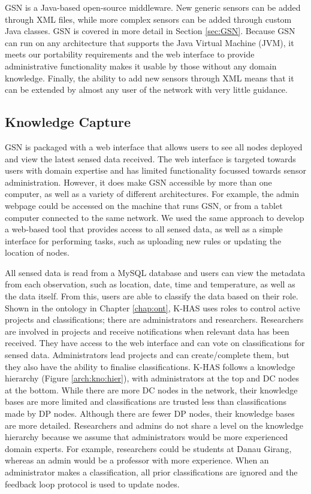 	GSN is a Java-based open-source middleware. New generic sensors can be added through XML files, while more complex sensors can be added through custom Java classes. GSN is covered in more detail in Section \ref{sec:GSN}. Because GSN can run on any architecture that supports the Java Virtual Machine (JVM), it meets our portability requirements and the web interface to provide administrative functionality makes it usable by those without any domain knowledge. Finally, the ability to add new sensors through XML means that it can be extended by almost any user of the network with very little guidance.

	\subsection{Knowledge Capture}\label{arch:kc}
		GSN is packaged with a web interface that allows users to see all nodes deployed and view the latest sensed data received. The web interface is targeted towards users with domain expertise and has limited functionality focussed towards sensor administration. However, it does make GSN accessible by more than one computer, as well as a variety of different architectures. For example, the admin webpage could be accessed on the machine that runs GSN, or from a tablet computer connected to the same network. We used the same approach to develop a web-based tool that provides access to all sensed data, as well as a simple interface for performing tasks, such as uploading new rules or updating the location of nodes.

		All sensed data is read from a MySQL database and users can view the metadata from each observation, such as location, date, time and temperature, as well as the data itself. From this, users are able to classify the data based on their role. Shown in the ontology in Chapter \ref{chap:ont}, K-HAS uses roles to control active projects and classifications; there are administrators and researchers. Researchers are involved in projects and receive notifications when relevant data has been received. They have access to the web interface and can vote on classifications for sensed data. Administrators lead projects and can create/complete them, but they also have the ability to finalise classifications. K-HAS follows a knowledge hierarchy (Figure \ref{arch:kno:hier}), with administrators at the top and DC nodes at the bottom. While there are more DC nodes in the network, their knowledge bases are more limited and classifications are trusted less than classifications made by DP nodes. Although there are fewer DP nodes, their knowledge bases are more detailed. Researchers and admins do not share a level on the knowledge hierarchy because we assume that administrators would be more experienced domain experts. For example, researchers could be students at Danau Girang, whereas an admin would be a professor with more experience. When an administrator makes a classification, all prior classifications are ignored and the feedback loop protocol is used to update nodes.

